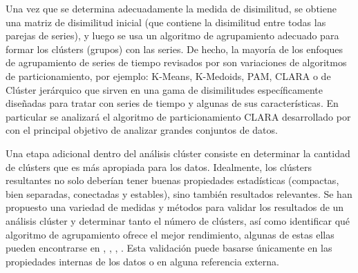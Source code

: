 \documentclass[12pt,oneside]{book}\usepackage[]{graphicx}\usepackage[]{color}
\theoremstyle{definition} %
\begin{document}
Una vez que se determina adecuadamente la medida de disimilitud, se obtiene una matriz de disimilitud inicial (que contiene la disimilitud entre todas las parejas de series), y luego se usa un algoritmo de agrupamiento adecuado para formar los clústers (grupos) con las series. De hecho, la mayoría de los enfoques de agrupamiento de series de tiempo revisados por  \citeauthor{liao2005clustering}  \citeyear{liao2005clustering} son variaciones de algoritmos de particionamiento, por ejemplo: K-Means, K-Medoids, PAM, CLARA \citeauthor{kaufman1986clustering} \citeyear{kaufman1986clustering}  o de Clúster jerárquico que sirven en una gama de disimilitudes específicamente diseñadas para tratar con series de tiempo y algunas de sus características. 
En particular se analizará el algoritmo de particionamiento CLARA desarrollado por  \citeauthor{kaufman1990finding} \citeyear{kaufman1990finding} con el principal objetivo de analizar grandes conjuntos de datos.


Una etapa adicional dentro del análisis clúster consiste en determinar la cantidad de clústers que es más apropiada para los datos. Idealmente, los clústers resultantes no solo deberían tener buenas propiedades estadísticas (compactas, bien separadas, conectadas y estables), sino también resultados relevantes. Se han propuesto una variedad de medidas y métodos para validar los resultados de un análisis clúster y determinar tanto el número de clústers, así como identificar qué algoritmo de agrupamiento ofrece el mejor rendimiento, algunas de estas ellas pueden encontrarse en \citeauthor{fraley1998many} \citeyear{fraley1998many}, \citeauthor{duda2001pattern} \citeyear{duda2001pattern}, \citeauthor{kerr2001bootstrapping} \citeyear{kerr2001bootstrapping}, \citeauthor{salvador2004determining} \citeyear{salvador2004determining}. Esta validación puede basarse únicamente en las propiedades internas de los datos o en alguna referencia externa.
\end{document}
